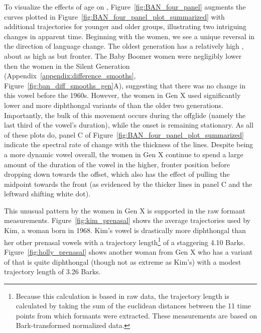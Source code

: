 To visualize the effects of age on \ban, Figure~\ref{fig:BAN_four_panel} augments the curves plotted in Figure~\ref{fig:BAN_four_panel_plot_summarized} with additional trajectories for younger and older groups, illustrating two intriguing changes in apparent time. Beginning with the women, we see a unique reversal in the direction of language change. The oldest generation has a relatively high \ban, about as high as \bet but fronter. The Baby Boomer women were negligibly lower then the women in the Silent Generation (Appendix~\ref{appendix:difference_smooths}, Figure~\ref{fig:ban_diff_smooths_gen}A), suggesting that there was no change in this vowel before the 1960s. However, the women in Gen X used significantly lower and more diphthongal variants of \ban than the older two generations. Importantly, the bulk of this movement occurs during the offglide (namely the last third of the vowel's duration), while the onset is remaining stationary. As all of these plots do, panel C of Figure~\ref{fig:BAN_four_panel_plot_summarized} indicate the spectral rate of change with the thickness of the lines. Despite being a more dynamic vowel overall, the women in Gen X continue to spend a large amount of the duration of the vowel in the higher, fronter position before dropping down towards the offset, which also has the effect of pulling the midpoint towards the front (as evidenced by the thicker lines in panel C and the leftward shifting white dot).

This unusual pattern by the women in Gen X is supported in the raw formant measurements. Figure~\ref{fig:kim_prenasal} shows the average trajectories used by Kim, a woman born in 1968. Kim's \ban vowel is drastically more diphthongal than her other prenasal vowels with a trajectory length\footnote{Because this calculation is based in raw data, the trajectory length is calculated by taking the sum of the euclidean distances between the 11 time points from which formants were extracted. These measurements are based on Bark-transformed normalized data.} of a staggering 4.10 Barks. Figure~\ref{fig:holly_prenasal} shows another woman from Gen X who has a variant of \ban that is quite diphthongal (though not as extreme as Kim's) with a modest trajectory length of 3.26 Barks.

